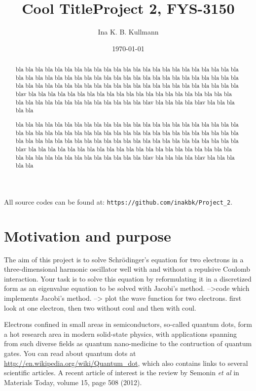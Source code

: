 \documentclass[11pt,a4wide]{article}
\title{{\Huge {\bf Cool Title}}\linebreak \small{Project 2, FYS-3150}}
\author{Ina K. B. Kullmann}
\date{\today}
\begin{document}
\maketitle

\begin{center}
{ \scriptsize \noindent All source codes can be found at: \texttt{https://github.com/inakbk/Project\_2}. }
\end{center}

\tableofcontents
\newpage

\begin{abstract}
bla bla bla bla bla bla bla bla bla bla bla bla bla bla bla bla bla bla bla bla bla bla bla bla bla bla bla bla bla bla bla bla bla bla bla bla bla bla bla bla bla bla bla bla bla bla bla bla bla bla bla bla bla bla bla bla bla bla bla bla bla bla bla bla bla bla bla bla bla blav bla bla bla bla bla bla bla bla bla bla bla bla bla bla bla bla bla bla bla bla bla bla bla bla bla bla bla bla bla bla bla bla bla bla blav bla bla bla bla blav bla bla bla bla bla

bla bla bla bla bla bla bla bla bla bla bla bla bla bla bla bla bla bla bla bla bla bla bla bla bla bla bla bla bla bla bla bla bla bla bla bla bla bla bla bla bla bla bla bla bla bla bla bla bla bla bla bla bla bla bla bla bla bla bla bla bla bla bla bla bla bla bla bla bla blav bla bla bla bla bla bla bla bla bla bla bla bla bla bla bla bla bla bla bla bla bla bla bla bla bla bla bla bla bla bla bla bla bla bla blav bla bla bla bla blav bla bla bla bla bla
\end{abstract}


\section{Motivation and purpose}
The aim of this project is to solve Schr\"odinger's equation for two electrons in a three-dimensional harmonic oscillator well with and without a repulsive Coulomb interaction.  Your task is to solve this equation by reformulating it in a discretized form as an eigenvalue equation to be solved with Jacobi's method. -->code which implements Jacobi's method. --> plot the wave function for two electrons. first look at one electron, then two without coul and then with coul.

Electrons confined in small areas in semiconductors, so-called quantum dots, form a hot research area in modern solid-state physics, with applications spanning from such diverse fields as quantum nano-medicine to the contruction of quantum gates. You can read about quantum dots at \url{http://en.wikipedia.org/wiki/Quantum_dot}, which also contains links to several scientific articles. A recent article of interest is the review by Semonin {\em et al} in Materials Today, volume 15, page 508 (2012).
\end{document}
